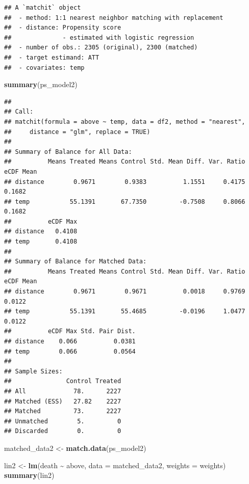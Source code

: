 \documentclass[
]{article}
\newenvironment{Shaded}{\begin{snugshade}}{\end{snugshade}}
\newcommand{\AttributeTok}[1]{\textcolor[rgb]{0.13,0.29,0.53}{#1}}
\newcommand{\FunctionTok}[1]{\textcolor[rgb]{0.13,0.29,0.53}{\textbf{#1}}}
\newcommand{\NormalTok}[1]{#1}
\newcommand{\OtherTok}[1]{\textcolor[rgb]{0.56,0.35,0.01}{#1}}
\newcommand{\SpecialCharTok}[1]{\textcolor[rgb]{0.81,0.36,0.00}{\textbf{#1}}}
\begin{document}
\begin{verbatim}
## A `matchit` object
##  - method: 1:1 nearest neighbor matching with replacement
##  - distance: Propensity score
##              - estimated with logistic regression
##  - number of obs.: 2305 (original), 2300 (matched)
##  - target estimand: ATT
##  - covariates: temp
\end{verbatim}

\begin{Shaded}
\begin{Highlighting}[]
\FunctionTok{summary}\NormalTok{(ps\_model2)}
\end{Highlighting}
\end{Shaded}

\begin{verbatim}
## 
## Call:
## matchit(formula = above ~ temp, data = df2, method = "nearest", 
##     distance = "glm", replace = TRUE)
## 
## Summary of Balance for All Data:
##          Means Treated Means Control Std. Mean Diff. Var. Ratio eCDF Mean
## distance        0.9671        0.9383          1.1551     0.4175    0.1682
## temp           55.1391       67.7350         -0.7508     0.8066    0.1682
##          eCDF Max
## distance   0.4108
## temp       0.4108
## 
## Summary of Balance for Matched Data:
##          Means Treated Means Control Std. Mean Diff. Var. Ratio eCDF Mean
## distance        0.9671        0.9671          0.0018     0.9769    0.0122
## temp           55.1391       55.4685         -0.0196     1.0477    0.0122
##          eCDF Max Std. Pair Dist.
## distance    0.066          0.0381
## temp        0.066          0.0564
## 
## Sample Sizes:
##               Control Treated
## All             78.      2227
## Matched (ESS)   27.82    2227
## Matched         73.      2227
## Unmatched        5.         0
## Discarded        0.         0
\end{verbatim}

\begin{Shaded}
\begin{Highlighting}[]
\NormalTok{matched\_data2 }\OtherTok{\textless{}{-}} \FunctionTok{match.data}\NormalTok{(ps\_model2)}

\NormalTok{lin2 }\OtherTok{\textless{}{-}} \FunctionTok{lm}\NormalTok{(death }\SpecialCharTok{\textasciitilde{}}\NormalTok{ above, }\AttributeTok{data =}\NormalTok{ matched\_data2, }\AttributeTok{weights =}\NormalTok{ weights)}
\FunctionTok{summary}\NormalTok{(lin2)}
\end{Highlighting}
\end{Shaded}
\end{document}
